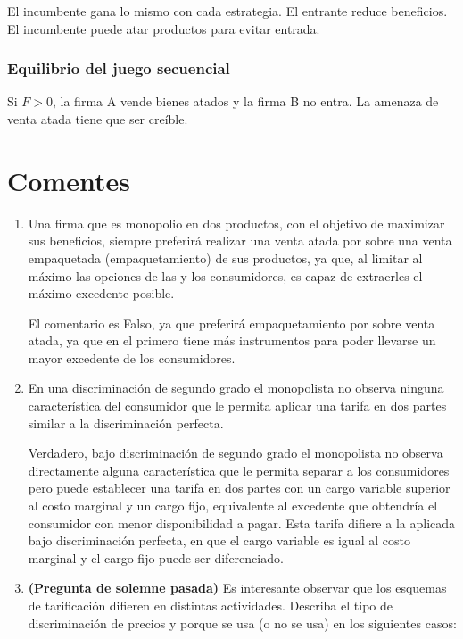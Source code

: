 \documentclass{exam}
\begin{document}
El incumbente gana lo mismo con cada estrategia. El entrante reduce beneficios. El incumbente puede atar productos para evitar entrada.

\subsubsection*{Equilibrio del juego secuencial}
Si $F > 0$, la firma A vende bienes atados y la firma B no entra. La amenaza de venta atada tiene que ser creíble. 

\newpage

\section{Comentes}
\begin{enumerate}
    \item Una firma que es monopolio en dos productos, con el objetivo de maximizar sus beneficios, siempre preferirá realizar una venta atada por sobre una venta empaquetada (empaquetamiento) de sus productos, ya que, al limitar al máximo las opciones de las y los consumidores, es capaz de extraerles el máximo excedente posible.
    \begin{solution}
        El comentario es Falso, ya que preferirá empaquetamiento por sobre venta atada, ya que en el primero tiene más instrumentos para poder llevarse un mayor excedente de los consumidores.
    \end{solution}
    \item En una discriminación de segundo grado el monopolista no observa ninguna característica del consumidor que le permita aplicar una tarifa en dos partes similar a la discriminación perfecta.
    \begin{solution}
        Verdadero, bajo discriminación de segundo grado el monopolista no observa directamente alguna característica que le permita separar a los consumidores pero puede establecer una tarifa en dos partes con un cargo variable superior al costo marginal y un cargo fijo, equivalente al excedente que obtendría el consumidor con menor disponibilidad a pagar. Esta tarifa difiere a la aplicada bajo discriminación perfecta, en que el cargo variable es igual al costo marginal y el cargo fijo puede ser diferenciado.
    \end{solution}
    \item \textbf{(Pregunta de solemne pasada)} Es interesante observar que los esquemas de tarificación difieren en distintas actividades. Describa el tipo de discriminación de precios y porque se usa (o no se usa) en los siguientes casos:

\end{enumerate}
\end{document}

